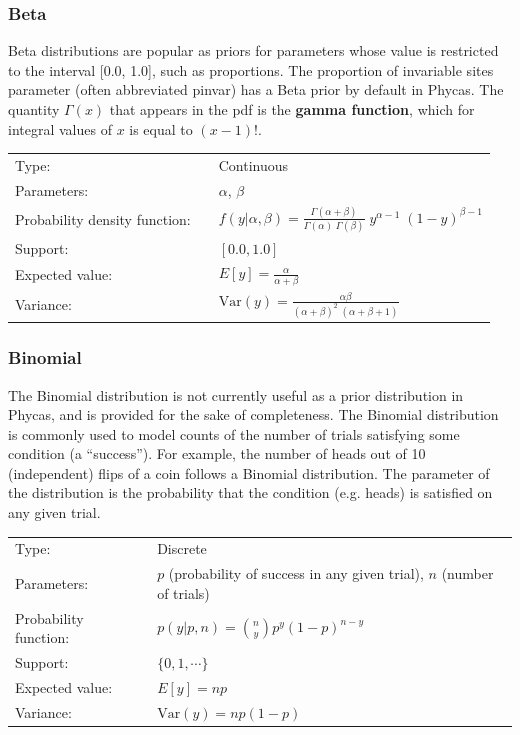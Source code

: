 \documentclass[10pt]{article}
\newcommand{\term}[1]{{\bfseries #1}\index{#1}}		%
\newcommand{\Var}{\mbox{Var}}
\begin{document}
\subsubsection{Beta}\label{betadist}

Beta distributions are popular as priors for parameters whose value is restricted to the interval [0.0, 1.0], such as proportions. The proportion of invariable sites parameter (often abbreviated pinvar) has a Beta prior by default in Phycas. The quantity $\Gamma(x)$ that appears in the pdf is the \term{gamma function}, which for integral values of $x$ is equal to $(x-1)!$.

\begin{tabular}{lcl}
Type:                 & & Continuous \\
Parameters:           & & $\alpha$, $\beta$   \\
Probability density function: & & $f(y|\alpha, \beta) = \frac{\Gamma(\alpha + \beta)}{\Gamma(\alpha) \; \Gamma(\beta)} \; y^{\alpha-1} \; (1-y)^{\beta - 1}$ \\
Support:              & & $[0.0,1.0]$     \\
Expected value:       & & $E[y] = \frac{\alpha}{\alpha + \beta}$ \\
Variance:             & & $\Var(y) = \frac{\alpha \beta}{(\alpha + \beta)^2 \; (\alpha + \beta + 1)}$ 
\end{tabular}

\subsubsection{Binomial}\label{binomialdist}

The Binomial distribution is not currently useful as a prior distribution in Phycas, and is provided for the sake of completeness. The Binomial distribution is commonly used to model counts of the number of trials satisfying some condition (a ``success''). For example, the number of heads out of 10 (independent) flips of a coin follows a Binomial distribution. The parameter of the distribution is the probability that the condition (e.g. heads) is satisfied on any given trial.

\begin{tabular}{lcl}
Type:                 & & Discrete \\
Parameters:           & & $p$ (probability of success in any given trial), $n$ (number of trials)    \\
Probability function: & & $p(y|p,n) = {n \choose y} p^y (1-p)^{n-y} $ \\
Support:              & & $\{0,1,\cdots\}$     \\
Expected value:       & & $E[y] = n p$ \\
Variance:             & & $\Var(y) = n p(1-p)$ 
\end{tabular}
\end{document}

